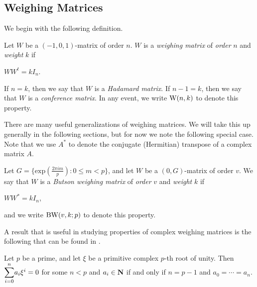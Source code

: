\documentclass[../../../main]{subfiles}
\begin{document}

\subsection{Weighing Matrices}

We begin with the following definition.

\begin{defin}\label{weighing matrix}
  Let $W$ be a $(-1,0,1)$-matrix of order $n$. $W$ is a {\it weighing matrix} of {\it order} $n$ and {\it weight} $k$ if
  \begin{defenum}
  \item $WW^t = kI_n$.
  \end{defenum}
  If $n=k$, then we say that $W$ is a {\it Hadamard matrix}. If $n-1=k$, then we say that $W$ is a {\it conference matrix}. In any event, we write $\text{W}(n,k)$ to denote this property.
\end{defin}

There are many useful generalizations of weighing matrices. We will take this up
generally in the following sections, but for now we note the following special
case. Note that we use $A^*$ to denote the conjugate (Hermitian) transpose of a complex matrix $A$.

\begin{defin}\label{butson-unitary}
  Let $G = \{\mathrm{exp}(\frac{2\pi im}{p}) : 0 \leq m < p\}$, and let $W$ be a $(0,G)$-matrix of order $v$. We say that $W$ is a {\it Butson weighing matrix} of {\it order} $v$ and {\it weight} $k$ if
  \begin{defenum}
  \item $WW^* = kI_n$,
  \end{defenum}
  and we write $\text{BW}(v,k;p)$ to denote this property.
\end{defin}

A result that is useful in studying properties of complex weighing matrices is
the following that can be found in \cite{lam-leung}.

\begin{lem}\label{butson lemma}
  Let $p$ be a prime, and let $\xi$ be a primitive complex $p$-th root of unity. Then $\ssum_{i=0}^n a_i\xi^i = 0$ for some $n < p$ and $a_i \in \mathbf{N}$ if and only if $n = p-1$ and $a_0 = \cdots = a_n$.
\end{lem}
\end{document}
